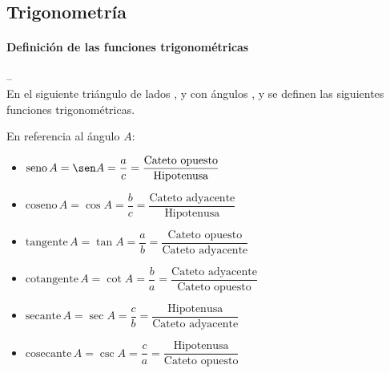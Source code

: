 \documentclass[11pt, twocolumn, landscape, a4paper]{article}
\begin{document}
\subsection*{Trigonometría}
\paragraph*{Definición de las funciones trigonométricas} -- \\
\noindent En el siguiente triángulo de lados ,  y  con ángulos ,  y  se definen las siguientes funciones trigonométricas. \\ 


\noindent En referencia al ángulo $A$:
\begin{itemize}
\item{$\text{seno}\,A = \sen A = \dfrac{a}{c} = \dfrac{\text{Cateto opuesto}}{\text{Hipotenusa}}$}
\item{$\text{coseno}\,A = \cos A = \dfrac{b}{c} = \dfrac{\text{Cateto adyacente}}{\text{Hipotenusa}}$}
\item{$\text{tangente}\,A = \tan A = \dfrac{a}{b} = \dfrac{\text{Cateto opuesto}}{\text{Cateto adyacente}}$}
\item{$\text{cotangente}\,A = \cot A = \dfrac{b}{a} = \dfrac{\text{Cateto adyacente}}{\text{Cateto opuesto}}$}
\item{$\text{secante}\,A = \sec A = \dfrac{c}{b} = \dfrac{\text{Hipotenusa}}{\text{Cateto adyacente}}$}
\item{$\text{cosecante}\,A = \csc A = \dfrac{c}{a} = \dfrac{\text{Hipotenusa}}{\text{Cateto opuesto}}$}
\end{itemize}
\end{document}
